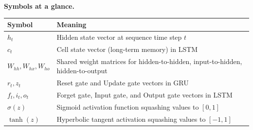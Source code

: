 \documentclass[a4paper,11pt]{article}
\begin{document}
\medskip
\noindent\textbf{Symbols at a glance.}
\begin{center}\small
\begin{tabular}{@{}ll@{}}
  \toprule
  \textbf{Symbol} & \textbf{Meaning} \\
  \midrule
  $h_t$ & Hidden state vector at sequence time step $t$ \\
  $c_t$ & Cell state vector (long-term memory) in LSTM \\
  $W_{hh}, W_{hx}, W_{ho}$ & Shared weight matrices for hidden-to-hidden, input-to-hidden, hidden-to-output \\
  $r_t, z_t$ & Reset gate and Update gate vectors in GRU \\
  $f_t, i_t, o_t$ & Forget gate, Input gate, and Output gate vectors in LSTM \\
  $\sigma(z)$ & Sigmoid activation function squashing values to $[0, 1]$ \\
  $\tanh(z)$ & Hyperbolic tangent activation squashing values to $[-1, 1]$ \\
  \bottomrule
\end{tabular}
\end{center}
\end{document}
